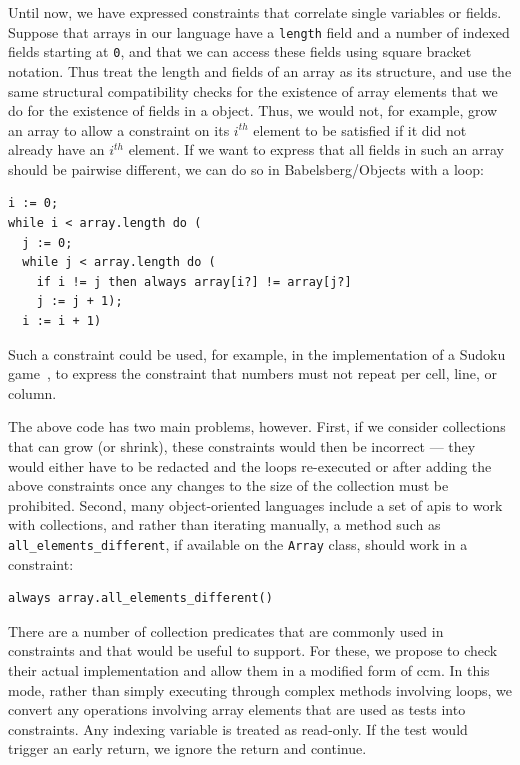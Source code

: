 Until now, we have expressed constraints that correlate single
variables or fields. Suppose that arrays in our language have a
\verb!length! field and a number of indexed fields starting at
\verb!0!, and that we can access these fields using square bracket
notation. Thus treat the length and fields of an array as its
structure, and use the same structural compatibility checks for the
existence of array elements that we do for the existence of fields in
a object.  Thus, we would not, for example, grow an array to allow a
constraint on its $i^{th}$ element to be satisfied if it did not
already have an $i^{th}$ element. If we want to express that all
fields in such an array should be pairwise different, we can do so in
Babelsberg/Objects with a loop:
\begin{lstlisting}
i := 0;
while i < array.length do (
  j := 0;
  while j < array.length do (
    if i != j then always array[i?] != array[j?]
    j := j + 1);
  i := i + 1)
\end{lstlisting}
Such a constraint could be used, for example, in the implementation of
a Sudoku game~\cite{lynce2006sudoku}, to express the constraint that
numbers must not repeat per cell, line, or column.

The above code has two main problems, however. First, if we consider
collections that can grow (or shrink), these constraints would then be
incorrect --- they would either have to be redacted and the loops
re-executed or after adding the above constraints once any changes to
the size of the collection must be prohibited. Second, many
object-oriented languages include a set of \acp{api} to work with
collections, and rather than iterating manually, a method such as
\verb!all_elements_different!, if available on the \verb!Array! class,
should work in a constraint:
\begin{lstlisting}
always array.all_elements_different()
\end{lstlisting}

There are a number of collection predicates that are commonly used in
constraints and that would be useful to support. For these, we propose
to check their actual implementation and allow them in a modified form
of \gls{ccm}. In this mode, rather than simply executing through
complex methods involving loops, we convert any operations involving
array elements that are used as tests into constraints. Any indexing
variable is treated as read-only. If the test would trigger an early
return, we ignore the return and continue.

